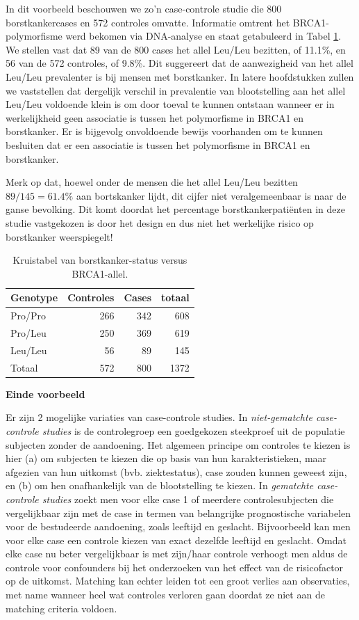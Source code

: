 \documentclass[
  12pt,dutch,coursenotes]{book}
\begin{document}
In dit voorbeeld beschouwen we zo'n case-controle studie die 800 borstkankercases en 572 controles omvatte. Informatie omtrent het BRCA1-polymorfisme werd bekomen via DNA-analyse en staat getabuleerd in Tabel \ref{tab:leu}.
We stellen vast dat 89 van de 800 cases het allel Leu/Leu bezitten, of 11.1\%, en 56 van de 572 controles, of 9.8\%. Dit suggereert dat de aanwezigheid van het allel Leu/Leu prevalenter is bij mensen met borstkanker. In latere hoofdstukken zullen
we vaststellen dat dergelijk verschil in prevalentie van blootstelling aan
het allel Leu/Leu voldoende klein is om door toeval te kunnen ontstaan wanneer er in
werkelijkheid geen associatie is tussen het polymorfisme in BRCA1 en borstkanker. Er is bijgevolg onvoldoende bewijs voorhanden om te kunnen besluiten dat er een associatie is tussen het polymorfisme in BRCA1 en borstkanker.

Merk op dat, hoewel onder de mensen die het allel Leu/Leu bezitten \(89/145=61.4\%\) aan bortskanker lijdt, dit cijfer niet
veralgemeenbaar is naar de ganse bevolking. Dit komt doordat het percentage
borstkankerpatiënten in deze studie vastgekozen is door het design en dus
niet het werkelijke risico op borstkanker weerspiegelt!

\begin{table}

\caption{\label{tab:leu}Kruistabel van borstkanker-status versus BRCA1-allel.}
\centering
\begin{tabular}[t]{lrrr}
\toprule
Genotype & Controles & Cases & totaal\\
\midrule
Pro/Pro & 266 & 342 & 608\\
Pro/Leu & 250 & 369 & 619\\
Leu/Leu & 56 & 89 & 145\\
Totaal & 572 & 800 & 1372\\
\bottomrule
\end{tabular}
\end{table}

\textbf{Einde voorbeeld}

Er zijn 2 mogelijke variaties van case-controle studies. In \emph{niet-gematchte case-controle studies} is de controlegroep een goedgekozen
steekproef uit de populatie subjecten zonder de
aandoening. Het algemeen principe om controles te kiezen is hier (a) om
subjecten te kiezen die op basis van hun karakteristieken,
maar afgezien van hun uitkomst (bvb. ziektestatus), case zouden kunnen
geweest zijn, en (b) om hen onafhankelijk van de blootstelling te kiezen. In
\emph{gematchte case-controle studies} zoekt men voor elke case 1 of
meerdere controlesubjecten die vergelijkbaar zijn met de case in termen van
belangrijke prognostische variabelen voor de bestudeerde aandoening, zoals
leeftijd en geslacht. Bijvoorbeeld kan men voor elke case een controle
kiezen van exact dezelfde leeftijd en geslacht. Omdat elke case nu beter
vergelijkbaar is met zijn/haar controle verhoogt men aldus de controle voor
confounders bij het onderzoeken van het effect van de risicofactor op de
uitkomst. Matching kan echter leiden tot een groot verlies aan observaties,
met name wanneer heel wat controles verloren gaan doordat ze niet aan de
matching criteria voldoen.
\end{document}
